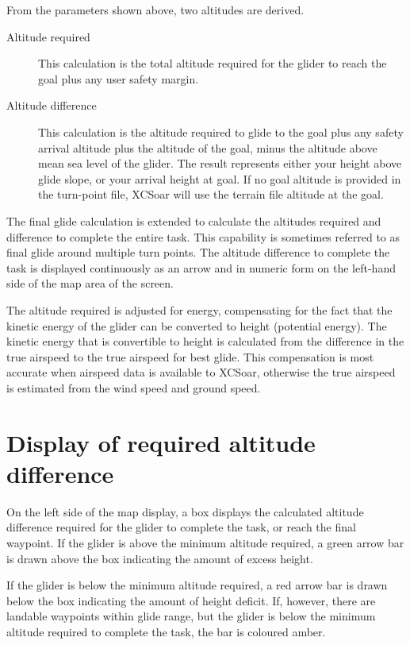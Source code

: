 From the parameters shown above, two altitudes are derived.
\begin{description}
\item[Altitude required]
This calculation is the total altitude required for the glider to
reach the goal plus any user safety margin. 
\item[Altitude difference]
This calculation is the altitude required to glide to the goal plus
any safety arrival altitude plus the altitude of the goal, minus the
altitude above mean sea level of the glider.  The result represents
either your height above glide slope, or your arrival height at goal.
If no goal altitude is provided in the turn-point file, XCSoar will use
the terrain file altitude at the goal.
\end{description}

The final glide calculation is extended to calculate the altitudes
required and difference to complete the entire task.  This capability
is sometimes referred to as final glide around multiple turn points.
The altitude difference to complete the task is displayed continuously
as an arrow and in numeric form on the left-hand side of the map area
of the screen.

The altitude required is adjusted for energy, compensating for
the fact that the kinetic energy of the glider can be converted to
height (potential energy).  The kinetic energy that is convertible to
height is calculated from the difference in the true airspeed to the
true airspeed for best glide.  This compensation is most accurate when
airspeed data is available to XCSoar, otherwise the true airspeed is
estimated from the wind speed and ground speed.


\section{Display of required altitude difference}

On the left side of the map display, a box displays the calculated
altitude difference required for the glider to complete the task, or
reach the final waypoint.  If the glider is above the minimum altitude
required, a green arrow bar is drawn above the box indicating the
amount of excess height.

If the glider is below the minimum altitude required, a red arrow bar is
drawn below the box indicating the amount of height deficit.  If,
however, there are landable waypoints within glide range, but the
glider is below the minimum altitude required to complete the task, the
bar is coloured amber.

